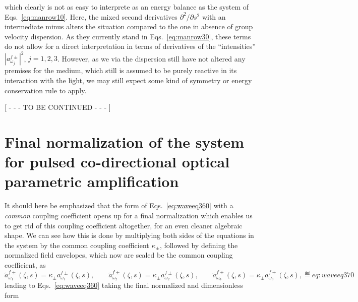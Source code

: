 which clearly is not as easy to interprete as an energy balance as the system of
Eqs.~\eqref{eq:manrow10}. Here, the mixed second derivatives $\partial^2/
\partial s^2$ with an intermediate minus alters the situation compared to the
one in absence of group velocity dispersion. As they currently stand in
Eqs.~\eqref{eq:manrow30}, these terms do not allow for a direct interpretation
in terms of derivatives of the ``intensities'' $|a^{f\pm}_{\omega_j}|^2$, $j=1,2,3$.
However, as we via the dispersion still have not altered any premises for the
medium, which still is assumed to be purely reactive in its interaction with
the light, we may still expect some kind of symmetry or energy conservation
rule to apply.
\vskip20pt
\centerline{[ - - - TO BE CONTINUED - - - ]}
\vskip20pt

\section{Final normalization of the system for pulsed co-directional
         optical parametric amplification}
It should here be emphasized that the form of Eqs.~\eqref{eq:waveeq360} with a
{\it common} coupling coefficient opens up for a final normalization which
enables us to get rid of this coupling coefficient altogether, for an even
cleaner algebraic shape. We can see how this is done by multiplying both sides
of the equations in the system by the common coupling coefficient $\kappa_{\pm}$,
followed by defining the normalized field envelopes, which now are scaled be
the common coupling coefficient, as
$$
  \tilde{a}^{f\pm}_{\omega_1}(\zeta,s)=\kappa_{\pm} a^{f\pm}_{\omega_1}(\zeta,s),\qquad
  \tilde{a}^{f\pm}_{\omega_2}(\zeta,s)=\kappa_{\pm} a^{f\pm}_{\omega_2}(\zeta,s),\qquad
  \tilde{a}^{f\mp}_{\omega_3}(\zeta,s)=\kappa_{\pm} a^{f\mp}_{\omega_3}(\zeta,s),
  \eqdef{eq:waveeq370}
$$
leading to Eqs.~\eqref{eq:waveeq360} taking the final normalized and
dimensionless form
